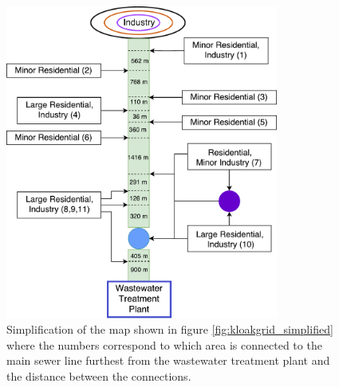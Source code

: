 \begin{figure}[H]
\centering
\includegraphics[width=0.8\textwidth]{report/system_overview/pictures/sewer_line_diagram.pdf}
\caption{Simplification of the map shown in figure \ref{fig:kloakgrid_simplified} where the numbers correspond to which area is connected to the main sewer line furthest from the wastewater treatment plant and the distance between the connections.}
\label{fig:sewer_line_diagram}
\end{figure}